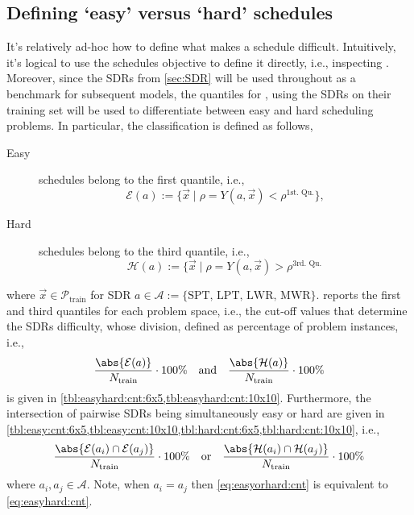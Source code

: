 \subsection{Defining `easy' versus `hard' schedules}
It's relatively ad-hoc how to define what makes a schedule difficult. Intuitively, it's logical to use the schedules objective to define it directly, i.e., inspecting \fullnamerho. Moreover, since the SDRs from \cref{sec:SDR} will be used throughout as a benchmark for subsequent models, the quantiles for \namerho, using the SDRs on their training set will be used to differentiate between easy and hard scheduling problems. In particular, the classification is defined as follows, 
\begin{description}
\item[Easy] schedules belong to the first quantile, i.e., \hfill \\
\begin{equation}
\mathcal{E}(a):=\{\vec{x}\;|\;\rho=Y(a,\vec{x})<\rho^{\text{1st. Qu.}}\},
\end{equation} 
\item[Hard] schedules belong to the third quantile, i.e., \hfill \\
\begin{equation}
\mathcal{H}(a):=\{\vec{x}\;|\;\rho=Y(a,\vec{x})>\rho^{\text{3rd. Qu.}}\,
\end{equation} 
\end{description}
where $\vec{x}\in\mathcal{P}_{\text{train}}$ for SDR  $a\in\mathcal{A}:=\{\text{SPT,~LPT,~LWR,~MWR}\}$.
 reports the first and third quantiles for each problem space, i.e., the cut-off values that determine the SDRs difficulty, whose division, defined as percentage of problem instances, i.e., 
\begin{equation}\label{eq:easyhard:cnt}
\frac{\abs{\mathcal{E}(a)}}{N_{\text{train}}} \cdot 100\%
\quad \text{and} \quad 
\frac{\abs{\mathcal{H}(a)}}{N_{\text{train}}}\cdot 100\%
\end{equation}
is given in \cref{tbl:easyhard:cnt:6x5,tbl:easyhard:cnt:10x10}. Furthermore, the intersection of pairwise SDRs being simultaneously easy or hard are given in \cref{tbl:easy:cnt:6x5,tbl:easy:cnt:10x10,tbl:hard:cnt:6x5,tbl:hard:cnt:10x10}, i.e., 
\begin{equation}\label{eq:easyorhard:cnt}
\frac{\abs{\mathcal{E}(a_i)\cap \mathcal{E}(a_j) }}{N_{\text{train}}} \cdot 100\%
\quad \text{or} \quad 
\frac{\abs{\mathcal{H}(a_i)\cap \mathcal{H}(a_j)}}{N_{\text{train}}}\cdot 100\%
\end{equation}
where $a_i,a_j\in\mathcal{A}$. Note, when $a_i=a_j$ then \cref{eq:easyorhard:cnt} is equivalent to \cref{eq:easyhard:cnt}.

